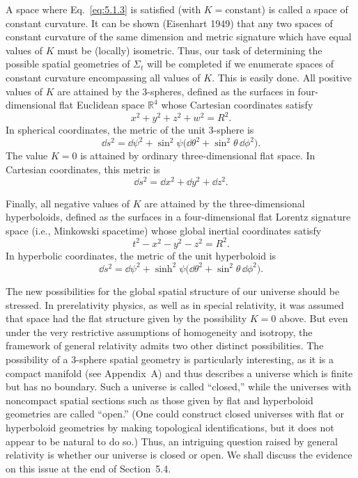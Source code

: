 A space where Eq.~\eqref{eq:5.1.3} is satisfied (with \(K=\text{constant}\)) is
called a space of constant curvature. It can be shown (Eisenhart 1949) that any two
spaces of constant curvature of the same dimension and metric signature which have
equal values of \(K\) must be (locally) isometric. Thus, our task of determining the
possible spatial geometries of \(\Sigma_t\) will be completed if we enumerate spaces
of constant curvature encompassing all values of \(K\). This is easily done. All
positive values of \(K\) are attained by the 3-spheres, defined as the surfaces in
four-dimensional flat Euclidean space \(\mathbb{R}^4\) whose Cartesian coordinates
satisfy
\begin{equation}
  x^2+y^2+z^2+w^2=R^2.
  \tag{5.1.5}\label{eq:5.1.5}
\end{equation}
In spherical coordinates, the metric of the unit 3-sphere is
\begin{equation}
  \dd s^2=\dd\psi^2+\sin^2\psi\bigl(\dd\theta^2+\sin^2\theta\,\dd\phi^2\bigr).
  \tag{5.1.6}\label{eq:5.1.6}
\end{equation}
The value \(K=0\) is attained by ordinary three-dimensional flat space. In Cartesian
coordinates, this metric is
\begin{equation}
  \dd s^2=\dd x^2+\dd y^2+\dd z^2.
  \tag{5.1.7}\label{eq:5.1.7}
\end{equation}

Finally, all negative values of \(K\) are attained by the three-dimensional
hyperboloids, defined as the surfaces in a four-dimensional flat Lorentz signature
space (i.e., Minkowski spacetime) whose global inertial coordinates satisfy
\begin{equation}
  t^2-x^2-y^2-z^2=R^2.
  \tag{5.1.8}\label{eq:5.1.8}
\end{equation}
In hyperbolic coordinates, the metric of the unit hyperboloid is
\begin{equation}
  \dd s^2=\dd\psi^2+\sinh^2\psi\bigl(\dd\theta^2+\sin^2\theta\,\dd\phi^2\bigr).
  \tag{5.1.9}\label{eq:5.1.9}
\end{equation}

The new possibilities for the global spatial structure of our universe should be
stressed. In prerelativity physics, as well as in special relativity, it was assumed
that space had the flat structure given by the possibility \(K=0\) above. But even
under the very restrictive assumptions of homogeneity and isotropy, the framework
of general relativity admits two other distinct possibilities. The possibility of a
3-sphere spatial geometry is particularly interesting, as it is a compact manifold
(see Appendix~A) and thus describes a universe which is finite but has no boundary.
Such a universe is called ``closed,'' while the universes with noncompact spatial
sections such as those given by flat and hyperboloid geometries are called ``open.''
(One could construct closed universes with flat or hyperboloid geometries by making
topological identifications, but it does not appear to be natural to do so.) Thus, an
intriguing question raised by general relativity is whether our universe is closed or
open. We shall discuss the evidence on this issue at the end of Section~5.4.

